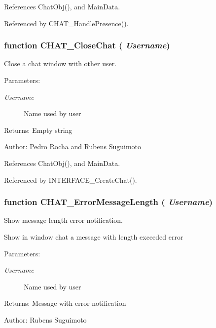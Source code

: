 References ChatObj(), and MainData.

Referenced by CHAT\_\-HandlePresence().
\subsubsection[CHAT\_\-CloseChat]{\setlength{\rightskip}{0pt plus 5cm}function CHAT\_\-CloseChat ( {\em Username})}\label{chat_2chat_8js_c9f7e14cbc16fc2651af090c9897cd14}


Close a chat window with other user. 

\begin{Desc}
\item[Parameters:]
\begin{description}
\item[{\em Username}]Name used by user \end{description}
\end{Desc}
\begin{Desc}
\item[Returns:]Empty string \end{Desc}
\begin{Desc}
\item[Author:]Pedro Rocha and Rubens Suguimoto \end{Desc}


References ChatObj(), and MainData.

Referenced by INTERFACE\_\-CreateChat().
\subsubsection[CHAT\_\-ErrorMessageLength]{\setlength{\rightskip}{0pt plus 5cm}function CHAT\_\-ErrorMessageLength ( {\em Username})}\label{chat_2chat_8js_b2209d63183a617155f5107445aab070}


Show message length error notification. 

Show in window chat a message with length exceeded error

\begin{Desc}
\item[Parameters:]
\begin{description}
\item[{\em Username}]Name used by user \end{description}
\end{Desc}
\begin{Desc}
\item[Returns:]Message with error notification \end{Desc}
\begin{Desc}
\item[Author:]Rubens Suguimoto \end{Desc}


